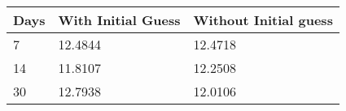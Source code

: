 \begin{tabular}{lll}
Days & With Initial Guess & Without Initial guess \\ 
\hline 
7 & 12.4844 & 12.4718 \\ 
14 & 11.8107 & 12.2508 \\ 
30 & 12.7938 & 12.0106 \\ 
\hline 
\end{tabular}